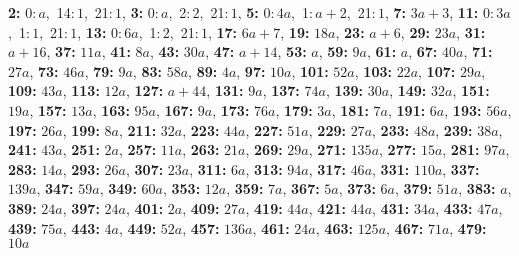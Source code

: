 \textsf{\bfseries 2:} 0:\,$a$,\ 14:\,$1$,\ 21:\,$1$, \textsf{\bfseries 3:} 0:\,$a$,\ 2:\,$2$,\ 21:\,$1$, \textsf{\bfseries 5:} 0:\,$4a$,\ 1:\,$a + 2$,\ 21:\,$1$, \textsf{\bfseries 7:} $3a + 3$, \textsf{\bfseries 11:} 0:\,$3a$,\ 1:\,$1$,\ 21:\,$1$, \textsf{\bfseries 13:} 0:\,$6a$,\ 1:\,$2$,\ 21:\,$1$, \textsf{\bfseries 17:} $6a + 7$, \textsf{\bfseries 19:} $18a$, \textsf{\bfseries 23:} $a + 6$, \textsf{\bfseries 29:} $23a$, \textsf{\bfseries 31:} $a + 16$, \textsf{\bfseries 37:} $11a$, \textsf{\bfseries 41:} $8a$, \textsf{\bfseries 43:} $30a$, \textsf{\bfseries 47:} $a + 14$, \textsf{\bfseries 53:} $a$, \textsf{\bfseries 59:} $9a$, \textsf{\bfseries 61:} $a$, \textsf{\bfseries 67:} $40a$, \textsf{\bfseries 71:} $27a$, \textsf{\bfseries 73:} $46a$, \textsf{\bfseries 79:} $9a$, \textsf{\bfseries 83:} $58a$, \textsf{\bfseries 89:} $4a$, \textsf{\bfseries 97:} $10a$, \textsf{\bfseries 101:} $52a$, \textsf{\bfseries 103:} $22a$, \textsf{\bfseries 107:} $29a$, \textsf{\bfseries 109:} $43a$, \textsf{\bfseries 113:} $12a$, \textsf{\bfseries 127:} $a + 44$, \textsf{\bfseries 131:} $9a$, \textsf{\bfseries 137:} $74a$, \textsf{\bfseries 139:} $30a$, \textsf{\bfseries 149:} $32a$, \textsf{\bfseries 151:} $19a$, \textsf{\bfseries 157:} $13a$, \textsf{\bfseries 163:} $95a$, \textsf{\bfseries 167:} $9a$, \textsf{\bfseries 173:} $76a$, \textsf{\bfseries 179:} $3a$, \textsf{\bfseries 181:} $7a$, \textsf{\bfseries 191:} $6a$, \textsf{\bfseries 193:} $56a$, \textsf{\bfseries 197:} $26a$, \textsf{\bfseries 199:} $8a$, \textsf{\bfseries 211:} $32a$, \textsf{\bfseries 223:} $44a$, \textsf{\bfseries 227:} $51a$, \textsf{\bfseries 229:} $27a$, \textsf{\bfseries 233:} $48a$, \textsf{\bfseries 239:} $38a$, \textsf{\bfseries 241:} $43a$, \textsf{\bfseries 251:} $2a$, \textsf{\bfseries 257:} $11a$, \textsf{\bfseries 263:} $21a$, \textsf{\bfseries 269:} $29a$, \textsf{\bfseries 271:} $135a$, \textsf{\bfseries 277:} $15a$, \textsf{\bfseries 281:} $97a$, \textsf{\bfseries 283:} $14a$, \textsf{\bfseries 293:} $26a$, \textsf{\bfseries 307:} $23a$, \textsf{\bfseries 311:} $6a$, \textsf{\bfseries 313:} $94a$, \textsf{\bfseries 317:} $46a$, \textsf{\bfseries 331:} $110a$, \textsf{\bfseries 337:} $139a$, \textsf{\bfseries 347:} $59a$, \textsf{\bfseries 349:} $60a$, \textsf{\bfseries 353:} $12a$, \textsf{\bfseries 359:} $7a$, \textsf{\bfseries 367:} $5a$, \textsf{\bfseries 373:} $6a$, \textsf{\bfseries 379:} $51a$, \textsf{\bfseries 383:} $a$, \textsf{\bfseries 389:} $24a$, \textsf{\bfseries 397:} $24a$, \textsf{\bfseries 401:} $2a$, \textsf{\bfseries 409:} $27a$, \textsf{\bfseries 419:} $44a$, \textsf{\bfseries 421:} $44a$, \textsf{\bfseries 431:} $34a$, \textsf{\bfseries 433:} $47a$, \textsf{\bfseries 439:} $75a$, \textsf{\bfseries 443:} $4a$, \textsf{\bfseries 449:} $52a$, \textsf{\bfseries 457:} $136a$, \textsf{\bfseries 461:} $24a$, \textsf{\bfseries 463:} $125a$, \textsf{\bfseries 467:} $71a$, \textsf{\bfseries 479:} $10a$
